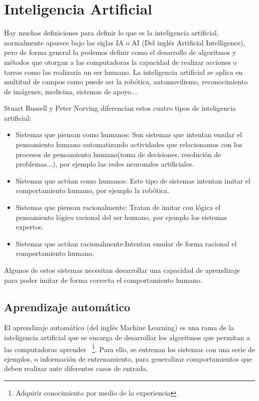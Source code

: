 \section{Inteligencia Artificial}
Hay muchas definiciones para definir lo que es la inteligencia artificial, normalmente aparece bajo las siglas IA o AI (Del inglés Artificial Intelligence), pero de forma general la podemos definir como el desarrollo de algoritmos y métodos que otorgan a las computadoras la capacidad de realizar acciones o tareas como las realizaría un ser humano. La inteligencia artificial se aplica en multitud de campos como puede ser la robótica, automovilismo, reconocimiento de imágenes, medicina, sistemas de apoyo...

Stuart Russell y Peter Norving\cite{wiki:tiposInteligenciaArtificial}  diferencian estos cuatro tipos de inteligencia artificial:

\begin{itemize}
	\item{Sistemas que piensan como humanos}: Son sistemas que intentan emular el pensamiento humano automatizando actividades que relacionamos con los procesos de pensamiento humano(toma de decisiones, resolución de problemas...), por ejemplo las redes neuronales artificiales.
	\item{Sistemas que actúan como humanos}: Este tipo de sistemas intentan imitar el comportamiento humano, por ejemplo la robótica.
	\item{Sistemas que piensan racionalmente}: Tratan de imitar con lógica el pensamiento lógico racional del ser humano, por ejemplo los sistemas expertos.
	\item{Sistemas que actúan racionalmente}:Intentan emular de forma racional el comportamiento humano.
\end{itemize}

Algunos de estos sistemas necesitan desarrollar una capacidad de aprendizaje para poder imitar de forma correcta el comportamiento humano.

\subsection{Aprendizaje automático}

El aprendizaje automático (del inglés Machine Learning) es una rama de la inteligencia artificial que se encarga de desarrollar los algoritmos que permitan a las computadoras aprender ~\footnote{Adquirir conocimiento por medio de la experiencia}. Para ello, se entrenan los sistemas con una serie de ejemplos, o información de entrenamiento, para generalizar comportamientos que deben realizar ante diferentes casos de entrada.

